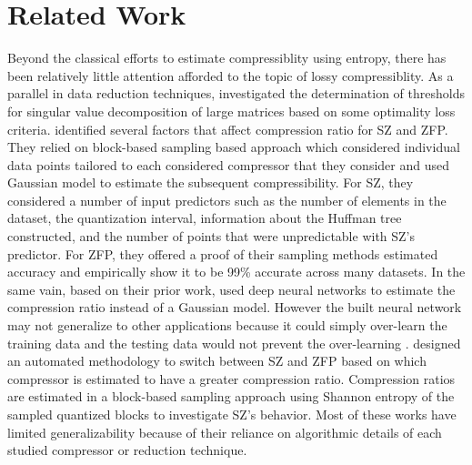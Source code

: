 \documentclass[conference]{IEEEtran}
\begin{document}
\section{Related Work}
Beyond the classical efforts to estimate compressiblity using entropy, there has been relatively little attention afforded to the topic of lossy compressiblity.
As a parallel in data reduction techniques, \cite{gavish2014} investigated the determination of thresholds for singular value  decomposition of large matrices based on some optimality loss  criteria.   
\cite{lu2018understanding} identified several factors that affect compression ratio for SZ and ZFP.  
They relied on block-based sampling based approach which considered individual data points tailored to each considered compressor that they consider and used Gaussian model to estimate the subsequent compressibility. 
For SZ, they considered a number of input predictors such as the number of elements in the dataset, the quantization interval, information about the Huffman tree constructed, and the number of points that were unpredictable with SZ's predictor.
For ZFP, they offered a proof of their sampling methods estimated accuracy and empirically show it to be 99\% accurate across many datasets. 
In the same vain, \cite{qin2020estimating} based  on their prior work, used deep neural networks to estimate the compression ratio instead of a Gaussian model.
 However the built neural network may not generalize to other applications because it could simply over-learn the training data and the testing data would not prevent the over-learning \cite{hanDataMiningConcepts2011}. 
\cite{taoOptimizingLossyCompression2019} designed an automated methodology to switch between SZ and ZFP based on which compressor  is estimated to have a greater compression ratio. Compression ratios are estimated in a block-based sampling approach using Shannon entropy \cite{Shannon1948} of the sampled quantized blocks to investigate SZ's behavior. 
Most of these works have limited generalizability because of their reliance on algorithmic details of each studied compressor or reduction technique.  

\end{document}
